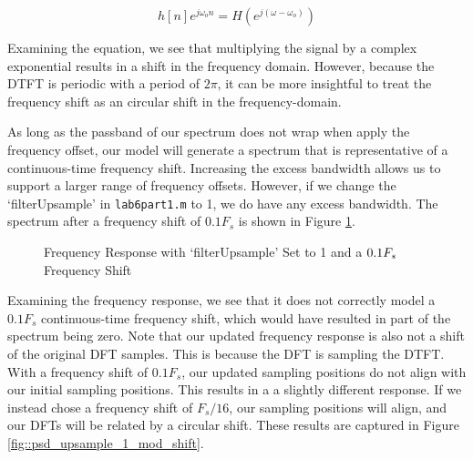 \documentclass{article}
\begin{document}
\begin{equation}
	h[n]e^{j\omega_on} = H\left(e^{j(\omega-\omega_o)}\right)
\end{equation}

\noindent Examining the equation, we see that multiplying the signal by a complex exponential results in a shift in the frequency domain. However, because the DTFT is periodic with a period of $2\pi$, it can be more insightful to treat the frequency shift as an circular shift in the frequency-domain. 

As long as the passband of our spectrum does not wrap when apply the frequency offset, our model will generate a spectrum that is representative of a continuous-time frequency shift. Increasing the excess bandwidth allows us to support a larger range of frequency offsets. However, if we change the `filterUpsample' in \texttt{lab6part1.m} to 1, we do have any excess bandwidth. The spectrum after a frequency shift of $0.1F_s$ is shown in Figure \ref{fig::psd_upsample_1}.

\begin{figure}[H]
	\centerline{}
	\caption{Frequency Response with `filterUpsample' Set to 1 and a $\protect{0.1F_s}$ Frequency Shift}
	\label{fig::psd_upsample_1}
\end{figure}

\noindent Examining the frequency response, we see that it does not correctly model a $0.1F_s$ continuous-time frequency shift, which would have resulted in part of the spectrum being zero. Note that our updated frequency response is also not a shift of the original DFT samples. This is because the DFT is sampling the DTFT. With a frequency shift of $0.1F_s$, our updated sampling positions do not align with our initial sampling positions. This results in a a slightly different response. If we instead chose a frequency shift of $F_s/16$, our sampling positions will align, and our DFTs will be related by a circular shift. These results are captured in Figure \ref{fig::psd_upsample_1_mod_shift}.
\end{document}
